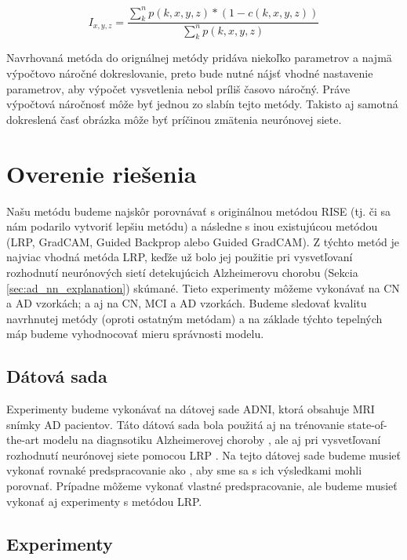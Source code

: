 \begin{equation} 
    I_{x, y, z} = \frac{\sum_{k}^{n} p(k, x, y, z) * (1 - c(k, x, y, z))}{\sum_{k}^{n} p(k, x, y, z)}
    \label{eq:risei_heatmap_1}
\end{equation}

Navrhovaná metóda do orignálnej metódy pridáva niekoľko parametrov a najmä výpočtovo náročné dokreslovanie, preto bude nutné nájsť vhodné nastavenie parametrov, aby výpočet vysvetlenia nebol príliš časovo náročný. Práve výpočtová náročnosť môže byť jednou zo slabín tejto metódy. Takisto aj samotná dokreslená časť obrázka môže byť príčinou zmätenia neurónovej siete.

\section{Overenie riešenia \label{sec:evaluation_design}}

Našu metódu budeme najskôr porovnávať s originálnou metódou RISE (tj. či sa nám podarilo vytvoriť lepšiu metódu) a následne s inou existujúcou metódou (LRP, GradCAM, Guided Backprop alebo Guided GradCAM). Z týchto metód je najviac vhodná metóda LRP, keďže už bolo jej použitie pri vysvetľovaní rozhodnutí neurónových sietí detekujúcich Alzheimerovu chorobu (Sekcia \ref{sec:ad_nn_explanation}) skúmané. Tieto experimenty môžeme vykonávať na CN a AD vzorkách; a aj na CN, MCI a AD vzorkách. Budeme sledovať kvalitu navrhnutej metódy (oproti ostatným metódam) a na základe týchto tepelných máp budeme vyhodnocovať mieru správnosti modelu.

\subsection{Dátová sada} Experimenty budeme vykonávať na dátovej sade ADNI, ktorá obsahuje MRI snímky AD pacientov. Táto dátová sada bola použitá aj na trénovanie state-of-the-art modelu na diagnsotiku Alzheimerovej choroby \cite{esmaeilzadeh2018end}, ale aj pri vysvetľovaní rozhodnutí neurónovej siete pomocou LRP \cite{bohle2019layer}. Na tejto dátovej sade budeme musieť vykonať rovnaké predspracovanie ako \citeauthor*{bohle2019layer}, aby sme sa s ich výsledkami mohli porovnať. Prípadne môžeme vykonať vlastné predspracovanie, ale budeme musieť vykonať aj experimenty s metódou LRP.

\subsection{Experimenty \label{sec:design_experiments}}

